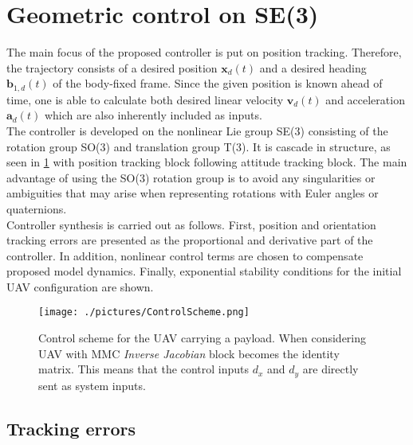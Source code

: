 \section{Geometric control on SE(3)} \label{sec:control}

The main focus of the proposed controller is put on position tracking. Therefore, the trajectory consists of a desired position $\textbf{x}_d(t)$ and a desired heading $\textbf{b}_{1,d}(t)$ of the body-fixed frame. Since the given position is known ahead of time, one is able to calculate both desired linear velocity $\textbf{v}_d(t)$ and acceleration $\textbf{a}_d(t)$ which are also inherently included as inputs. \\
The controller is developed on the nonlinear Lie group SE(3) consisting of the rotation group SO(3) and translation group T(3). It is cascade in structure, as seen in \ref{fig:control_scheme} with position tracking block following attitude tracking block. The main advantage of using the SO(3) rotation group is to avoid any singularities or ambiguities that may arise when representing rotations with Euler angles or quaternions. \\
Controller synthesis is carried out as follows. First, position and orientation tracking errors are presented as the proportional and derivative part of the controller. In addition, nonlinear control terms are chosen to compensate proposed model dynamics. Finally, exponential stability conditions for the initial UAV configuration are shown.

\begin{figure}
	\centering
	\texttt{[image: ./pictures/ControlScheme.png]}	
	\caption{Control scheme for the UAV carrying a payload. When considering UAV with MMC \textit{Inverse Jacobian} block becomes the identity matrix. This means that the control inputs $d_x$ and $d_y$ are directly sent as system inputs.}
	\label{fig:control_scheme}
\end{figure}

\subsection{Tracking errors}

